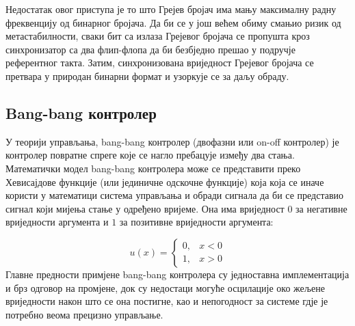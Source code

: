 \documentclass[master]{finthesis}
\begin{document}
Недостатак овог приступа је то што Грејев бројач има мању максималну радну фреквенцију од бинарног бројача. Да би се у још већем обиму смањио ризик од метастабилности, сваки бит са излаза Грејевог бројача се пропушта кроз синхронизатор са два флип-флопа да би безбједно прешао у подручје референтног такта. Затим, синхронизована вриједност Грејевог бројача се претвара у природан бинарни формат и узоркује се за даљу обраду.

\subsection{Bang-bang контролер} \label{section:bang_bang}
У теорији управљања, bang-bang контролер (двофазни или on-off контролер) је контролер повратне спреге које се нагло пребацује између два стања. Математички модел bang-bang контролера може се представити преко Хевисајдове функције (или јединичне одскочне функције) која која се иначе користи у математици система управљања и обради сигнала да би се представио сигнал који мијења стање у одређено вријеме. Она има вриједност $0$ за негативне вриједности аргумента и $1$ за позитивне вриједности аргумента:

\begin{equation}
	\label{eq_heaviside}
	u(x)= \begin{cases}
		0, & x < 0 \\
		1, & x > 0
		\end{cases}
\end{equation}
Главне предности примјене bang-bang контролера су једноставна имплементација и брз одговор на промјене, док су недостаци могуће осцилације око жељене вриједности након што се она постигне, као и непогодност за системе гдје је потребно веома прецизно управљање. \par 
\end{document}
